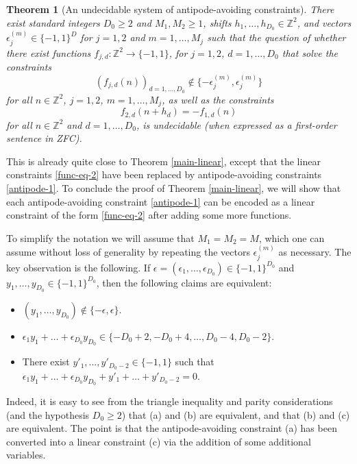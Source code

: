 \documentclass[reqno,a4paper,12pt]{amsart}
\numberwithin{equation}{section}
\numberwithin{figure}{section}
\def\Z{\mathbb{Z}}
\renewcommand\geq{\geqslant}
\theoremstyle{plain}
\newtheorem{theorem}[thm]{Theorem}
\theoremstyle{definition}
\begin{document}
\begin{theorem}[An undecidable system of antipode-avoiding constraints]\label{antipode}  There exist standard integers $D_0 \geq 2$ and $M_1,M_2 \geq 1$, shifts $h_1,\dots,h_{D_0} \in \Z^2$, and vectors $\epsilon_j^{(m)} \in \{-1,1\}^{D}$ for $j=1,2$ and $m=1,\dots,M_j$ such that the question of whether there exist functions $f_{j,d} \colon \Z^2 \to \{-1,1\}$, for $j=1,2$, $d=1,\dots,D_0$ that solve the constraints
\begin{equation}\label{antipode-1}
(f_{j,d}(n))_{d=1,\dots,D_0} \not \in \{ -\epsilon_j^{(m)}, \epsilon_j^{(m)} \}
\end{equation}
for all $n \in \Z^2$, $j=1,2$, $m =1,\dots,M_j$, as well as the constraints
\begin{equation}\label{antipode-2}
f_{2,d}(n+h_d) = - f_{1,d}(n)
\end{equation}
for all $n \in \Z^2$ and  $d = 1,\dots,D_0$, is undecidable (when expressed as a first-order sentence in ZFC).
\end{theorem}

This is already quite close to Theorem \ref{main-linear}, except that the linear constraints \eqref{func-eq-2} have been replaced by antipode-avoiding constraints \eqref{antipode-1}.  To conclude the proof of Theorem \ref{main-linear}, we will show that each antipode-avoiding constraint \eqref{antipode-1} can be encoded as a linear constraint of the form \eqref{func-eq-2} after adding some more functions.

To simplify the notation we will assume that $M_1=M_2=M$, which one can assume without loss of generality by repeating the vectors $\epsilon_j^{(m)}$ as necessary.  The key observation is the following.  If $\epsilon = (\epsilon_1,\dots,\epsilon_{D_0}) \in \{-1,1\}^{D_0}$ and $y_1,\dots,y_{D_0} \in \{-1,1\}^{D_0}$, then the following claims are equivalent:
\begin{itemize}
\item[(a)] $(y_1,\dots,y_{D_0}) \not \in \{-\epsilon, \epsilon\}$.
\item[(b)] $\epsilon_1 y_1 + \dots + \epsilon_{D_0} y_{D_0} \in \{ -D_0 + 2, -D_0 + 4, \dots, D_0 - 4, D_0 - 2 \}$.
\item[(c)] There exist $y'_1,\dots,y'_{D_0-2} \in \{-1,1\}$ such that $\epsilon_1 y_1 + \dots + \epsilon_{D_0} y_{D_0} + y'_1 + \dots + y'_{D_0-2} = 0$.
\end{itemize}
Indeed, it is easy to see from the triangle inequality and parity considerations (and the hypothesis $D_0 \geq 2$) that (a) and (b) are equivalent, and that (b) and (c) are equivalent. The point is that the antipode-avoiding constraint (a) has been converted into a linear constraint (c) via the addition of some additional variables.
\end{document}
